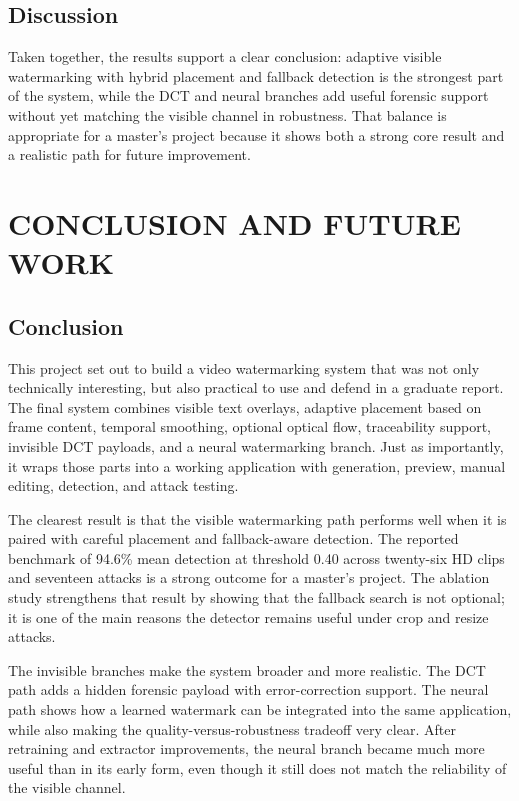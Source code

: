 \documentclass[12pt,oneside]{report}
\begin{document}
\section{Discussion}
Taken together, the results support a clear conclusion: adaptive visible watermarking with hybrid placement and fallback detection is the strongest part of the system, while the DCT and neural branches add useful forensic support without yet matching the visible channel in robustness. That balance is appropriate for a master's project because it shows both a strong core result and a realistic path for future improvement.

\clearpage
\chapter{CONCLUSION AND FUTURE WORK}
\section{Conclusion}
This project set out to build a video watermarking system that was not only technically interesting, but also practical to use and defend in a graduate report. The final system combines visible text overlays, adaptive placement based on frame content, temporal smoothing, optional optical flow, traceability support, invisible DCT payloads, and a neural watermarking branch. Just as importantly, it wraps those parts into a working application with generation, preview, manual editing, detection, and attack testing.

The clearest result is that the visible watermarking path performs well when it is paired with careful placement and fallback-aware detection. The reported benchmark of 94.6\% mean detection at threshold 0.40 across twenty-six HD clips and seventeen attacks is a strong outcome for a master's project. The ablation study strengthens that result by showing that the fallback search is not optional; it is one of the main reasons the detector remains useful under crop and resize attacks.

The invisible branches make the system broader and more realistic. The DCT path adds a hidden forensic payload with error-correction support. The neural path shows how a learned watermark can be integrated into the same application, while also making the quality-versus-robustness tradeoff very clear. After retraining and extractor improvements, the neural branch became much more useful than in its early form, even though it still does not match the reliability of the visible channel.
\end{document}
